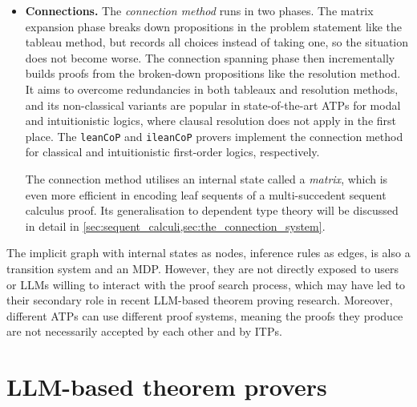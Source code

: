 \documentclass[twoside]{report}
\begin{document}
\begin{itemize}
        
    \item \textbf{Connections.} The \emph{connection method} \cite{prawitz1968proof,andrews1981theorem,bibel1981matrices} runs in two phases. The matrix expansion phase breaks down propositions in the problem statement like the tableau method, but records all choices instead of taking one, so the situation does not become worse. The connection spanning phase then incrementally builds proofs from the broken-down propositions like the resolution method. It aims to overcome redundancies in both tableaux and resolution methods, and its non-classical variants \cite{wallen1987automated} are popular in state-of-the-art ATPs for modal and intuitionistic logics, where clausal resolution does not apply in the first place. The \texttt{leanCoP} and \texttt{ileanCoP} provers \cite{otten2008leancop} implement the connection method for classical and intuitionistic first-order logics, respectively.
    
    The connection method utilises an internal state called a \emph{matrix}, which is even more efficient in encoding leaf sequents of a multi-succedent sequent calculus proof. Its generalisation to dependent type theory will be discussed in detail in \cref{sec:sequent_calculi,sec:the_connection_system}.
\end{itemize}

The implicit graph with internal states as nodes, inference rules as edges, is also a transition system and an MDP. However, they are not directly exposed to users or LLMs willing to interact with the proof search process, which may have led to their secondary role in recent LLM-based theorem proving research. Moreover, different ATPs can use different proof systems, meaning the proofs they produce are not necessarily accepted by each other and by ITPs.

\section{LLM-based theorem provers}
\label{sec:introduction_ltp}
\end{document}
